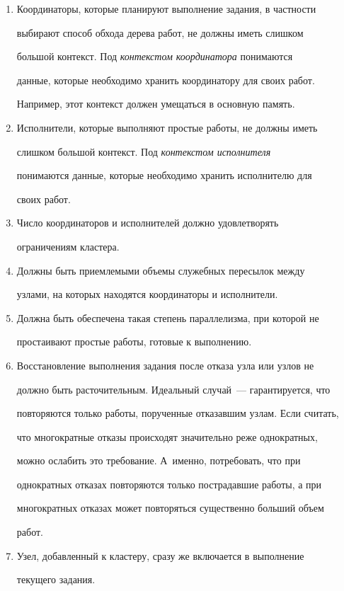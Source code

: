       \begin{enumerate}[1.]


\item Координаторы, которые планируют выполнение задания, в частности 


выбирают способ обхода дерева работ, не должны иметь слишком 


большой контекст. Под \textit{контекстом координатора} понимаются 


данные, которые необходимо хранить координатору для своих работ. 


Например, этот контекст должен умещаться в основную память.\\[-15pt]


\item Исполнители, которые выполняют простые работы,  не должны иметь 


слишком большой контекст. Под \textit{контекстом исполнителя} 


понимаются данные, которые необходимо хранить исполнителю для 


своих работ.\\[-15pt]


\item Число координаторов и исполнителей должно удовлетворять 


ограничениям кластера.\\[-15pt]


\item Должны быть приемлемыми объемы служебных пересылок между 


узлами, на которых находятся координаторы и исполнители.\\[-15pt]


\item Должна быть обеспечена такая степень параллелизма, при которой не 


простаивают простые работы, готовые к выполнению.\\[-15pt]


\item Восстановление выполнения задания после отказа узла или узлов не 


должно быть расточительным. Идеальный случай~--- гарантируется, что 


повторяются только работы, порученные отказавшим узлам. Если считать, 


что многократные отказы происходят значительно реже однократных, 


можно ослабить это требование. А~именно, потребовать, что при 


однократных отказах повторяются только пострадавшие работы, а при 


многократных отказах может повторяться существенно больший объем 


работ.\\[-15pt]


\item Узел, добавленный к кластеру, сразу же включается в выполнение 


текущего задания.


\end{enumerate}


